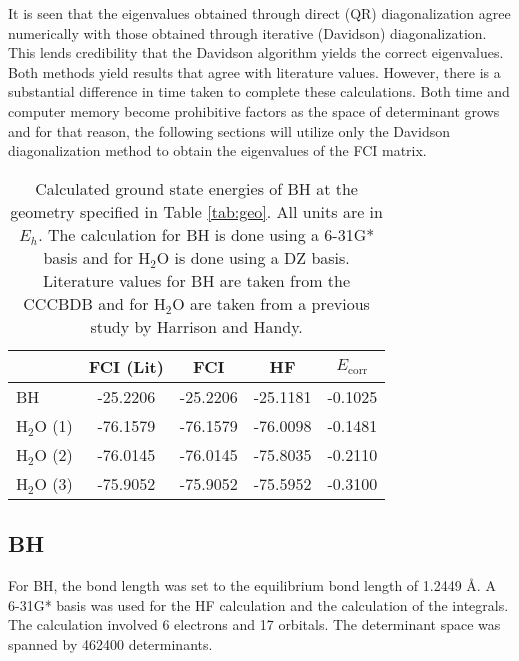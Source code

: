 \documentclass[final,3p,times,twocolumn]{elsarticle}
\begin{document}
It is seen that the eigenvalues obtained through direct (QR) diagonalization agree numerically with those obtained through iterative (Davidson) diagonalization. This lends credibility that the Davidson algorithm yields the correct eigenvalues. Both methods yield results that agree with literature values. However, there is a substantial difference in time taken to complete these calculations. Both time and computer memory become prohibitive factors as the space of determinant grows and for that reason, the following sections will utilize only the Davidson diagonalization method to obtain the eigenvalues of the FCI matrix.


\begin{table}
\centering
\begin{tabular}{l|c|ccc} \hline\hline
& FCI (Lit) & FCI & HF & $E_{\text{corr}}$ \\ \hline
BH & -25.2206 & -25.2206 & -25.1181 & -0.1025 \\ \hline
H$_2$O (1) & -76.1579 & -76.1579 & -76.0098 & -0.1481 \\ 
H$_2$O (2) & -76.0145 & -76.0145 & -75.8035 & -0.2110 \\
H$_2$O (3) & -75.9052 & -75.9052 & -75.5952 & -0.3100 \\\hline\hline
\end{tabular}
\caption{Calculated ground state energies of BH at the geometry specified in Table \ref{tab:geo}. All units are in $E_h$. The calculation for BH is done using a 6-31G* basis\cite{bhbasis} and for H$_2$O is done using a DZ basis.\cite{dunning} Literature values for BH are taken from the CCCBDB\cite{cccbdb} and for H$_2$O are taken from a previous study by Harrison and Handy.\cite{handy-1983}}
\label{tab:results}
\end{table}
\subsection{BH} \label{sec:bhresults}

For BH, the bond length was set to the equilibrium bond length of 1.2449 \AA. A 6-31G* basis\cite{bhbasis} was used for the HF calculation and the calculation of the integrals. The calculation involved 6 electrons and 17 orbitals. The determinant space was spanned by 462400 determinants.
\end{document}
